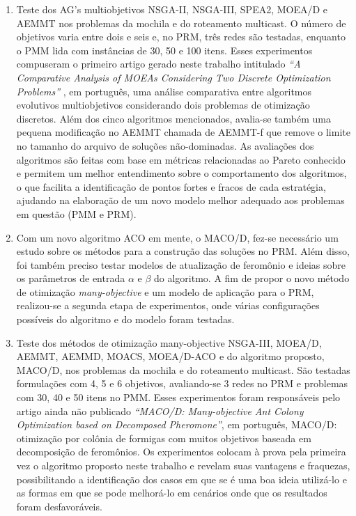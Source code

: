 \begin{enumerate}
	\item Teste dos AG's multiobjetivos NSGA-II, NSGA-III, SPEA2, MOEA/D e AEMMT nos problemas da mochila e do roteamento multicast. O número de objetivos varia entre dois e seis e, no PRM, três redes são testadas, enquanto o PMM lida com instâncias de 30, 50 e 100 itens. Esses experimentos compuseram o primeiro artigo gerado neste trabalho intitulado \textit{``A Comparative Analysis of MOEAs Considering Two Discrete Optimization Problems''} \cite{Franca2017}, em português, uma análise comparativa entre algoritmos evolutivos multiobjetivos considerando dois problemas de otimização discretos. Além dos cinco algoritmos mencionados, avalia-se também uma pequena modificação no AEMMT chamada de AEMMT-f que remove o limite no tamanho do arquivo de soluções não-dominadas. As avaliações dos algoritmos são feitas com base em métricas relacionadas ao Pareto conhecido e permitem um melhor entendimento sobre o comportamento dos algoritmos, o que facilita a identificação de pontos fortes e fracos de cada estratégia, ajudando na elaboração de um novo modelo melhor adequado aos problemas em questão (PMM e PRM).
	\item Com um novo algoritmo ACO em mente, o MACO/D, fez-se necessário um estudo sobre os métodos para a construção das soluções no PRM. Além disso, foi também preciso testar modelos de atualização de feromônio e ideias sobre os parâmetros de entrada $\alpha$ e $\beta$ do algoritmo. A fim de propor o novo método de otimização \textit{many-objective} e um modelo de aplicação para o PRM, realizou-se a segunda etapa de experimentos, onde várias configurações possíveis do algoritmo e do modelo foram testadas.
	\item Teste dos métodos de otimização many-objective NSGA-III, MOEA/D, AEMMT, AEMMD, MOACS, MOEA/D-ACO e do algoritmo proposto, MACO/D, nos problemas da mochila e do roteamento multicast. São testadas formulações com 4, 5 e 6 objetivos, avaliando-se 3 redes no PRM e problemas com 30, 40 e 50 itens no PMM. Esses experimentos foram responsáveis pelo artigo ainda não publicado \textit{``MACO/D: Many-objective Ant Colony Optimization based on Decomposed Pheromone''}, em português, MACO/D: otimização por colônia de formigas com muitos objetivos baseada em decomposição de feromônios. Os experimentos colocam à prova pela primeira vez o algoritmo proposto neste trabalho e revelam suas vantagens e fraquezas, possibilitando a identificação dos casos em que se é uma boa ideia utilizá-lo e as formas em que se pode melhorá-lo em cenários onde que os resultados foram desfavoráveis.

\end{enumerate}

